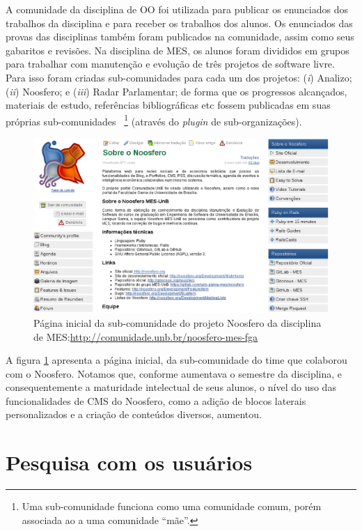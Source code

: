 A comunidade da disciplina de OO foi utilizada para  publicar os enunciados dos
trabalhos da disciplina e para receber os trabalhos dos alunos. Os enunciados
das provas das disciplinas também foram publicados na comunidade, assim como
seus gabaritos e revisões.
%
Na disciplina de MES, os alunos foram divididos em grupos para trabalhar com
manutenção e evolução de três projetos de software livre. Para isso foram
criadas sub-comunidades para cada um dos projetos:
%
(\textit{i}) Analizo;
(\textit{ii}) Noosfero;
e (\textit{iii}) Radar Parlamentar;
%
de forma que os progressos alcançados, materiais de estudo, referências
bibliográficas etc fossem publicadas em suas próprias sub-comunidades%
~\footnote{Uma sub-comunidade funciona como uma comunidade comum, porém
associada ao a uma comunidade ``mãe''.} (através do \textit{plugin} de
sub-organizações).

\begin{figure}[h!]
    \centering
    \includegraphics[keepaspectratio=true,scale=0.35]
      {figuras/Noosfero-MES.eps}
    \caption{Página inicial da sub-comunidade do projeto Noosfero da disciplina
    de MES:\newline \url{http://comunidade.unb.br/noosfero-mes-fga}}
    \label{mes-noosfero}
\end{figure}

A figura \ref{mes-noosfero} apresenta a página inicial,  da sub-comunidade do
time que colaborou com o Noosfero. Notamos que, conforme aumentava o semestre da
disciplina, e consequentemente a maturidade intelectual de seus alunos, o nível
do uso das funcionalidades de CMS do Noosfero, como a adição de blocos
laterais personalizados e a criação de conteúdos diversos, aumentou.

\section{Pesquisa com os usuários}

